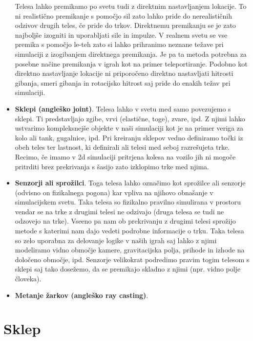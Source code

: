 \documentclass[12pt,a4paper,twoside]{book}
\begin{document}
\begin{itemize}
	Telesa lahko premikamo po svetu tudi z direktnim nastavljanjem lokacije. To ni realistično premikanje s pomočjo sil zato lahko pride do nerealističnih odzivov drugih teles, če pride do trkov. Direktnemu premikanju se je zato najboljše izogniti in uporabljati sile in impulze. V realnem svetu se vse premika s pomočjo le-teh zato si lahko prihranimo neznane težave pri simulaciji z izogibanjem direktnega premikanja. Je pa ta metoda potrebna za posebne načine premikanja v igrah kot na primer teleportiranje. Podobno kot direktno nastavljanje lokacije ni priporočeno direktno nastavljati hitrosti gibanja, smeri gibanja in rotacijsko hitrost saj pride do enakih težav pri simulaciji.
	\item \textbf{Sklepi (angleško joint)}. Telesa lahko v svetu med samo povezujemo s sklepi. Ti predstavljajo zgibe, vrvi (elastične, toge), zvare, ipd. Z njimi lahko ustvarimo kompleksnejše objekte v naši simulaciji kot je na primer veriga za kolo ali tank, gugalnice, ipd.  Pri kreiranju sklepov vedno definiramo točki iz obeh teles ter lastnost, ki definirali ali telesi med seboj razrešujeta trke. Recimo, če imamo v 2d simulaciji pritrjena kolesa na vozilo jih ni mogoče pritrditi brez prekrivanja s šasijo zato izklopimo trke med njima.
	\item \textbf{Senzorji ali sprožilci}. Toga telesa lahko označimo kot sprožilce ali senzorje (odvisno on fizikalnega pogona) kar vpliva na njihovo obnašanje v simulacijskem svetu. Taka telesa so fizikalno pravilno simulirana v prostoru vendar se na trke z drugimi telesi ne odzivajo (druga telesa se tudi ne odzovejo na trke). Vseeno pa nam ob prekrivanju z drugimi telesi sprožijo metode s katerimi nam dajo vedeti podrobne informacije o trku. Taka telesa so zelo uporabna za delovanje logike v naših igrah saj lahko z njimi modeliramo vidno območje kamere, gravitacijska polja, prihode in izhode na določeno območje, ipd. Senzorje velikokrat podredimo pravim togim telesom s sklepi saj tako dosežemo, da se premikajo skladno z njimi (npr. vidno polje človeka).
	\item \textbf{Metanje žarkov (angleško ray casting)}. 
\end{itemize}

\chapter{Sklep}\thispagestyle{fancy}

\cleardoublepage


\end{document}
